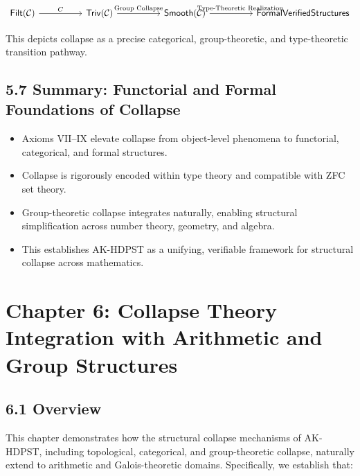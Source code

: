 \documentclass[11pt]{article}
\begin{document}
\[
\begin{tikzcd}[column sep=huge]
\mathsf{Filt}(\mathcal{C}) \arrow[r, "C"]
& \mathsf{Triv}(\mathcal{C}) \arrow[r, "\text{Group Collapse}"]
& \mathsf{Smooth}(\mathcal{C}) \arrow[r, "\hspace{2em}\text{Type-Theoretic Realization}"]
& \mathsf{Formal Verified Structures}
\end{tikzcd}
\]


This depicts collapse as a precise categorical, group-theoretic, and type-theoretic transition pathway.

\subsection*{5.7 Summary: Functorial and Formal Foundations of Collapse}

\begin{itemize}
    \item Axioms VII–IX elevate collapse from object-level phenomena to functorial, categorical, and formal structures.
    \item Collapse is rigorously encoded within type theory and compatible with ZFC set theory.
    \item Group-theoretic collapse integrates naturally, enabling structural simplification across number theory, geometry, and algebra.
    \item This establishes AK-HDPST as a unifying, verifiable framework for structural collapse across mathematics.
\end{itemize}



\section{Chapter 6: Collapse Theory Integration with Arithmetic and Group Structures}

\subsection*{6.1 Overview}

This chapter demonstrates how the structural collapse mechanisms of AK-HDPST, including topological, categorical, and group-theoretic collapse, naturally extend to arithmetic and Galois-theoretic domains. Specifically, we establish that:
\end{document}
